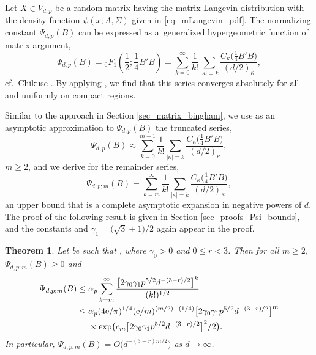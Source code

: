 \documentclass[pdftex]{sigma}
\numberwithin{equation}{section}
\newtheorem{Theorem}{Theorem}[section]
\def\R {\mathbb{R}}
\begin{document}
Let $X \in V_{d,p}$ be a random matrix having the matrix Langevin distribution with the density function $\psi(x;A,\Sigma)$ given in \eqref{eq_mLangevin_pdf}. The normalizing constant $\Psi_{d,p}(B)$ can be expressed as a~generalized hypergeometric function of matrix argument,
\[
\Psi_{d,p}(B) = {}_0F_1\left(\frac12;\frac14B'B\right) = \sum_{k=0}^\infty \frac{1}{k!} \sum_{|\kappa|=k} \frac{C_\kappa\bigl(\frac14 B'B\bigr)}{(d/2)_\kappa},
\]
cf.\ Chikuse \cite[p.~31]{Chikuse}. By applying \cite[Theorem 6.3]{GrossRichards}, we find that this series converges absolutely for all \smash{$B \in \R^{d \times p}$} and uniformly on compact regions.

Similar to the approach in Section \ref{sec_matrix_bingham}, we use as an asymptotic approximation to $\Psi_{d,p}(B)$ the truncated series,
\[
\Psi_{d,p}(B) \approx \sum_{k=0}^{m-1} \frac{1}{k!} \sum_{|\kappa|=k} \frac{C_\kappa\bigl(\frac14 B'B\bigr)}{(d/2)_\kappa},
\]
$m \ge 2$, and we derive for the remainder series,
\begin{equation}
\label{eq_Psi_m_Langevin}
\Psi_{d,p;m}(B) = \sum_{k=m}^\infty \frac{1}{k!} \sum_{|\kappa|=k} \frac{C_\kappa\bigl(\frac14 B'B\bigr)}{(d/2)_\kappa},
\end{equation}
an upper bound that is a complete asymptotic expansion in negative powers of $d$. The proof of the following result is given in Section \ref{sec_proofs_Psi_bounds}, and the constants  and $\gamma_1 = \bigl(\sqrt{3}+1\bigr)/2$ again appear in the proof.


\begin{Theorem}
\label{thm_Psi_m_bound_Langevin}
Let \smash{$B \in \R^{d \times p}$} be such that , where $\gamma_0 > 0$ and $0 \le r < 3$. Then for all $m \ge 2$, $\Psi_{d,p;m}(B) \ge 0$ and
\begin{align}
\Psi_{d,p;m}(B) \le{}& \alpha_p \sum_{k=m}^\infty \frac{\bigl[2 \gamma_0 \gamma_1 p^{5/2} d^{-(3-r)/2}\bigr]^k}{(k!)^{1/2}} \label{eq_Psi_m_bound} \\
\le{}& \alpha_p (4{\rm e}/\pi)^{1/4} ({\rm e}/m)^{(m/2)-(1/4)} \bigl[2 \gamma_0 \gamma_1 p^{5/2} d^{-(3-r)/2}\bigr]^m \nonumber \\
& \times \exp\bigl(c_m \bigl[2 \gamma_0 \gamma_1 p^{5/2} d^{-(3-r)/2}\bigr]^2/2\bigr). \label{eq_Psi_m_boundw}
\end{align}
In particular, $\Psi_{d,p;m}(B) = O\bigl(d^{-(3-r)m/2}\bigr)$ as $d \to \infty$.
\end{Theorem}
\end{document}
